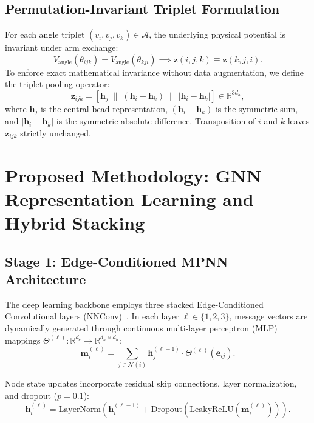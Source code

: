 \documentclass[11pt,a4paper]{article}
\begin{document}
\subsection{Permutation-Invariant Triplet Formulation}
For each angle triplet $(v_i, v_j, v_k) \in \mathcal{A}$, the underlying physical potential is invariant under arm exchange:
\begin{equation}
V_{\text{angle}}(\theta_{ijk}) = V_{\text{angle}}(\theta_{kji}) \implies \mathbf{z}(i, j, k) \equiv \mathbf{z}(k, j, i).
\end{equation}
To enforce exact mathematical invariance without data augmentation, we define the triplet pooling operator:
\begin{equation}
\mathbf{z}_{ijk} = \left[ \mathbf{h}_j \;\parallel\; (\mathbf{h}_i + \mathbf{h}_k) \;\parallel\; |\mathbf{h}_i - \mathbf{h}_k| \right] \in \mathbb{R}^{3 d_h},
\label{eq:triplet_pooling}
\end{equation}
where $\mathbf{h}_j$ is the central bead representation, $(\mathbf{h}_i + \mathbf{h}_k)$ is the symmetric sum, and $|\mathbf{h}_i - \mathbf{h}_k|$ is the symmetric absolute difference. Transposition of $i$ and $k$ leaves $\mathbf{z}_{ijk}$ strictly unchanged.

\section{Proposed Methodology: GNN Representation Learning and Hybrid Stacking}
\label{sec:method}

\subsection{Stage 1: Edge-Conditioned MPNN Architecture}
The deep learning backbone employs three stacked Edge-Conditioned Convolutional layers (NNConv)~\cite{gilmer2017neural}. In each layer $\ell \in \{1, 2, 3\}$, message vectors are dynamically generated through continuous multi-layer perceptron (MLP) mappings $\Theta^{(\ell)}: \mathbb{R}^{d_e} \to \mathbb{R}^{d_h \times d_h}$:
\begin{equation}
\mathbf{m}_i^{(\ell)} = \sum_{j \in \mathcal{N}(i)} \mathbf{h}_j^{(\ell-1)} \cdot \Theta^{(\ell)}(\mathbf{e}_{ij}).
\end{equation}

Node state updates incorporate residual skip connections, layer normalization, and dropout ($p = 0.1$):
\begin{equation}
\mathbf{h}_i^{(\ell)} = \text{LayerNorm}\left( \mathbf{h}_i^{(\ell-1)} + \text{Dropout}\left( \text{LeakyReLU}\left(\mathbf{m}_i^{(\ell)}\right) \right) \right).
\end{equation}
\end{document}
